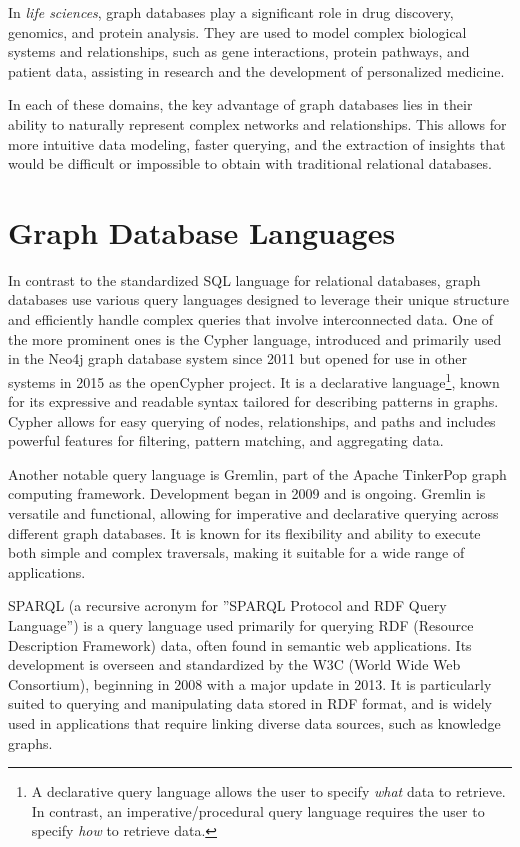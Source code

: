 In \emph{life sciences}, graph databases play a significant role in drug discovery, genomics, and protein analysis. They are used to model complex biological systems and relationships, such as gene interactions, protein pathways, and patient data, assisting in research and the development of personalized medicine.

In each of these domains, the key advantage of graph databases lies in their ability to naturally represent complex networks and relationships. This allows for more intuitive data modeling, faster querying, and the extraction of insights that would be difficult or impossible to obtain with traditional relational databases.

\section{Graph Database Languages}

In contrast to the standardized SQL language for relational databases, graph databases use various query languages designed to leverage their unique structure and efficiently handle complex queries that involve interconnected data. One of the more prominent ones is the Cypher language, introduced and primarily used in the Neo4j graph database system since 2011 but opened for use in other systems in 2015 as the openCypher project. It is a declarative language\footnote{A declarative query language allows the user to specify \emph{what} data to retrieve. In contrast, an imperative/procedural query language requires the user to specify \emph{how} to retrieve data.}, known for its expressive and readable syntax tailored for describing patterns in graphs. Cypher allows for easy querying of nodes, relationships, and paths and includes powerful features for filtering, pattern matching, and aggregating data.

Another notable query language is Gremlin, part of the Apache TinkerPop graph computing framework. Development began in 2009 and is ongoing. Gremlin is versatile and functional, allowing for imperative and declarative querying across different graph databases. It is known for its flexibility and ability to execute both simple and complex traversals, making it suitable for a wide range of applications.

SPARQL (a recursive acronym for ''SPARQL Protocol and RDF Query Language'') is a query language used primarily for querying RDF (Resource Description Framework) data, often found in semantic web applications. Its development is overseen and standardized by the W3C (World Wide Web Consortium), beginning in 2008 with a major update in 2013. It is particularly suited to querying and manipulating data stored in RDF format, and is widely used in applications that require linking diverse data sources, such as knowledge graphs.

